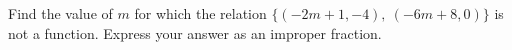 Find the value of $m$ for which the relation $\{(-2m+1,-4),\ (-6m+8,0)\}$ is not a function. Express your answer as an improper fraction.
